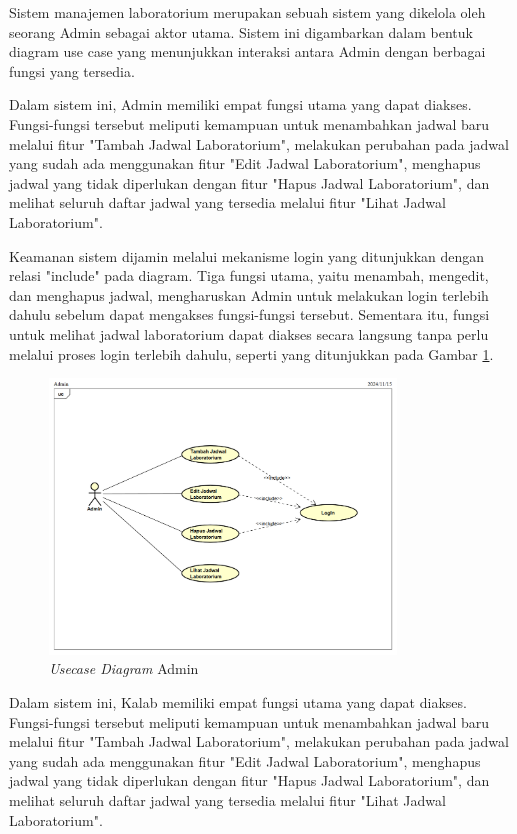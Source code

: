 Sistem manajemen laboratorium merupakan sebuah sistem yang dikelola oleh seorang Admin sebagai aktor utama. Sistem ini digambarkan dalam bentuk diagram use case yang menunjukkan interaksi antara Admin dengan berbagai fungsi yang tersedia.

Dalam sistem ini, Admin memiliki empat fungsi utama yang dapat diakses. Fungsi-fungsi tersebut meliputi kemampuan untuk menambahkan jadwal baru melalui fitur "Tambah Jadwal Laboratorium", melakukan perubahan pada jadwal yang sudah ada menggunakan fitur "Edit Jadwal Laboratorium", menghapus jadwal yang tidak diperlukan dengan fitur "Hapus Jadwal Laboratorium", dan melihat seluruh daftar jadwal yang tersedia melalui fitur "Lihat Jadwal Laboratorium".

Keamanan sistem dijamin melalui mekanisme login yang ditunjukkan dengan relasi "include" pada diagram. Tiga fungsi utama, yaitu menambah, mengedit, dan menghapus jadwal, mengharuskan Admin untuk melakukan login terlebih dahulu sebelum dapat mengakses fungsi-fungsi tersebut. Sementara itu, fungsi untuk melihat jadwal laboratorium dapat diakses secara langsung tanpa perlu melalui proses login terlebih dahulu, seperti yang ditunjukkan pada Gambar \ref{usecase-diagram-admin}.
\begin{figure}
	\centering
	\includegraphics[width=0.82\textwidth]{konten/gambar/usecase-diagram/admin.png}
	\caption{\textit{Usecase Diagram} Admin}
	\label{usecase-diagram-admin}
\end{figure}

Dalam sistem ini, Kalab memiliki empat fungsi utama yang dapat diakses. Fungsi-fungsi tersebut meliputi kemampuan untuk menambahkan jadwal baru melalui fitur "Tambah Jadwal Laboratorium", melakukan perubahan pada jadwal yang sudah ada menggunakan fitur "Edit Jadwal Laboratorium", menghapus jadwal yang tidak diperlukan dengan fitur "Hapus Jadwal Laboratorium", dan melihat seluruh daftar jadwal yang tersedia melalui fitur "Lihat Jadwal Laboratorium".

